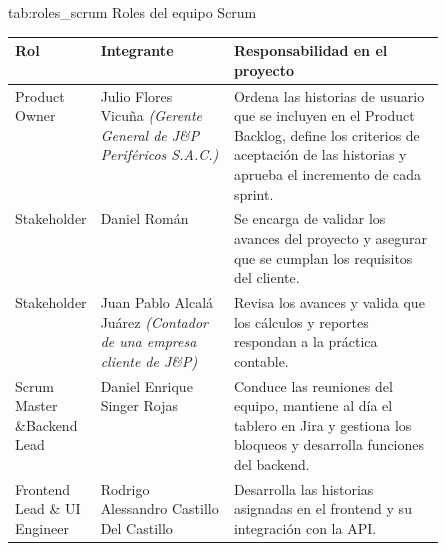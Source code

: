 \par
\noindent
\begin{minipage}{\linewidth}

    \tituloTablaAPA
        {tab:roles_scrum}
        {Roles del equipo Scrum}

    \begingroup
    \renewcommand{\baselinestretch}{1}
    \footnotesize
    \setlength{\tabcolsep}{4pt}
    \renewcommand{\arraystretch}{1.4}

    \begin{tabularx}{\linewidth}{
        @{}
        >{\raggedright\arraybackslash}p{0.19\linewidth}
        >{\raggedright\arraybackslash}p{0.31\linewidth}
        >{\raggedright\arraybackslash}X
        @{}
    }
        \toprule
        \textbf{Rol} &
        \textbf{Integrante} &
        \textbf{Responsabilidad en el proyecto} \\
        \midrule

        Product Owner &
        Julio Flores Vicuña\newline
        \textit{(Gerente General de J\&P Periféricos S.A.C.)} &
        Ordena las historias de usuario que se incluyen en el Product Backlog, \newline
        define los criterios de aceptación de las historias y aprueba el incremento de cada sprint. \\

        Stakeholder &
        Daniel Román &
        Se encarga de validar los avances del proyecto y asegurar que se cumplan los requisitos del cliente. \\

        Stakeholder &
        Juan Pablo Alcalá Juárez\newline
        \textit{(Contador de una empresa cliente de J\&P)} &
        Revisa los avances y valida que los cálculos y reportes respondan a la práctica contable. \\

        Scrum Master \&\newline Backend Lead &
        Daniel Enrique Singer Rojas &
        Conduce las reuniones del equipo, mantiene al día el tablero en Jira y gestiona los bloqueos y \newline 
        desarrolla funciones del backend. \\

        Frontend Lead \& UI Engineer &
        Rodrigo Alessandro Castillo Del Castillo &
        Desarrolla las historias asignadas en el frontend y su integración con la API. \\


\end{tabularx}
\end{minipage}
